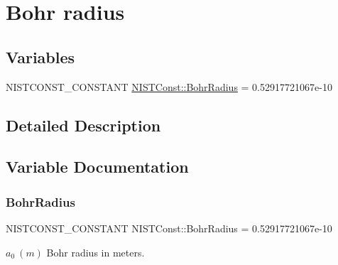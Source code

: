 \hypertarget{group___n_i_s_t_const-_bohr_radius}{}\section{Bohr radius}
\label{group___n_i_s_t_const-_bohr_radius}
\subsection*{Variables}
\begin{DoxyCompactItemize}
\item 
N\+I\+S\+T\+C\+O\+N\+S\+T\+\_\+\+C\+O\+N\+S\+T\+A\+NT \mbox{\hyperlink{group___n_i_s_t_const-_bohr_radius_ga9a18bd8c20d78ff8ad8747cdd623a07b}{N\+I\+S\+T\+Const\+::\+Bohr\+Radius}} = 0.\+52917721067e-\/10
\end{DoxyCompactItemize}


\subsection{Detailed Description}


\subsection{Variable Documentation}
\mbox{\label{group___n_i_s_t_const-_bohr_radius_ga9a18bd8c20d78ff8ad8747cdd623a07b}} 
\subsubsection{\texorpdfstring{Bohr\+Radius}{BohrRadius}}
{\footnotesize\ttfamily N\+I\+S\+T\+C\+O\+N\+S\+T\+\_\+\+C\+O\+N\+S\+T\+A\+NT N\+I\+S\+T\+Const\+::\+Bohr\+Radius = 0.\+52917721067e-\/10}

$a_0 \ (m)$ Bohr radius in meters. 